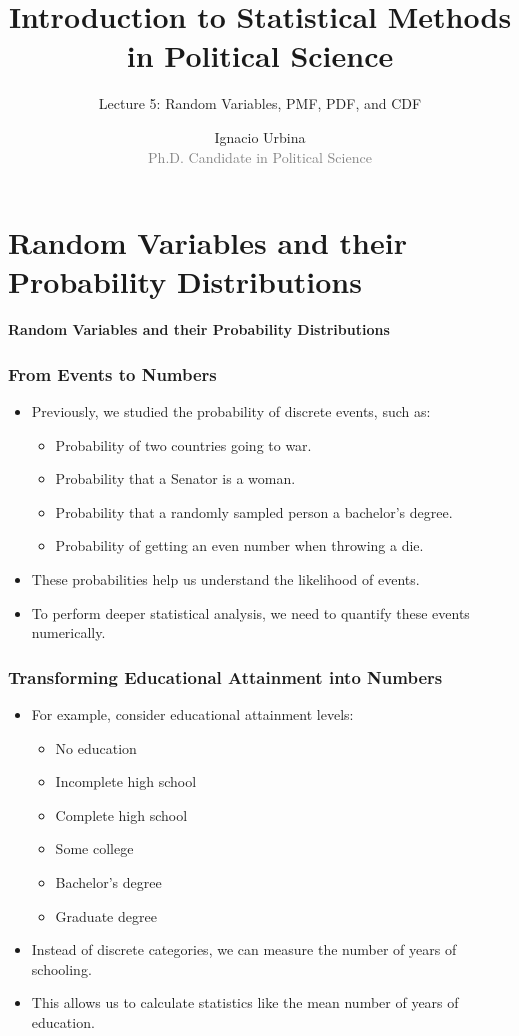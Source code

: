 \documentclass[handout]{beamer} %
\title{Introduction to Statistical Methods in Political Science}
\subtitle{Lecture 5: Random Variables, PMF, PDF, and CDF}
\author{Ignacio Urbina \texorpdfstring{\\ \vspace{0.3em}}{ } \scriptsize \textcolor{gray}{Ph.D. Candidate in Political Science}}
\date{}
\newcommand{\transitionslide}[1]{
    \begin{frame}[plain]
        \centering
        \vspace{1cm}
        \Huge
        \textcolor{moonstoneblue!150}{\textbf{#1}}
    \end{frame}
}
\begin{document}
\frame{\titlepage}

\section{Random Variables and their Probability Distributions}
\transitionslide{Random Variables and their Probability Distributions}

\begin{frame}
    \frametitle{From Events to Numbers}
    \begin{itemize}
        \item Previously, we studied the probability of discrete events, such as: \pause
        \begin{itemize}
            \item Probability of two countries going to war. \pause
            \item Probability that a Senator is a woman. \pause
            \item Probability that a randomly sampled person a bachelor's degree. \pause
            \item Probability of getting an even number when throwing a die.  \pause
        \end{itemize}
        \item These probabilities help us understand the likelihood of events. \pause
        \item To perform deeper statistical analysis, we need to quantify these events numerically.
    \end{itemize}
\end{frame}

\begin{frame}
    \frametitle{Transforming Educational Attainment into Numbers}
    \begin{itemize}
        \item For example, consider educational attainment levels: \pause
        \begin{itemize}
            \item No education \pause
            \item Incomplete high school \pause
            \item Complete high school \pause
            \item Some college \pause
            \item Bachelor's degree \pause
            \item Graduate degree \pause
        \end{itemize}
        \item Instead of discrete categories, we can measure the number of years of schooling. \pause
        \item This allows us to calculate statistics like the mean number of years of education.
    \end{itemize}
\end{frame}
\end{document}
